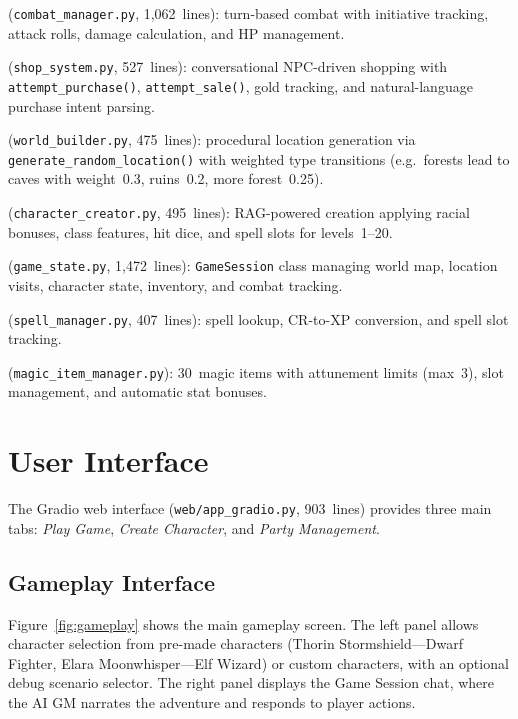\documentclass[12pt,a4paper]{article}
\begin{document}
\begin{description}[noitemsep]
    \item[Combat] (\texttt{combat\_manager.py}, 1,062~lines): turn-based
        combat with initiative tracking, attack rolls, damage calculation,
        and HP management.
    \item[Shop] (\texttt{shop\_system.py}, 527~lines): conversational
        NPC-driven shopping with \texttt{attempt\_purchase()},
        \texttt{attempt\_sale()}, gold tracking, and natural-language
        purchase intent parsing.
    \item[World] (\texttt{world\_builder.py}, 475~lines): procedural
        location generation via \texttt{generate\_random\_location()} with
        weighted type transitions (e.g.\ forests lead to caves with
        weight~0.3, ruins~0.2, more forest~0.25).
    \item[Character creation] (\texttt{character\_creator.py}, 495~lines):
        RAG-powered creation applying racial bonuses, class features, hit
        dice, and spell slots for levels~1--20.
    \item[Game state] (\texttt{game\_state.py}, 1,472~lines):
        \texttt{GameSession} class managing world map, location
        visits, character state, inventory, and combat tracking.
    \item[Spell management] (\texttt{spell\_manager.py}, 407~lines): spell
        lookup, CR-to-XP conversion, and spell slot tracking.
    \item[Magic items] (\texttt{magic\_item\_manager.py}): 30~magic items
        with attunement limits (max~3), slot management, and automatic
        stat bonuses.
\end{description}

\section{User Interface}
\label{sec:ui}

The Gradio web interface (\texttt{web/app\_gradio.py}, 903~lines) provides
three main tabs: \emph{Play Game}, \emph{Create Character}, and
\emph{Party Management}.

\subsection{Gameplay Interface}

Figure~\ref{fig:gameplay} shows the main gameplay screen.  The left panel
allows character selection from pre-made characters (Thorin
Stormshield---Dwarf Fighter, Elara Moonwhisper---Elf Wizard) or custom
characters, with an optional debug scenario selector.  The right panel
displays the Game Session chat, where the AI GM narrates the adventure and
responds to player actions.
\end{document}

